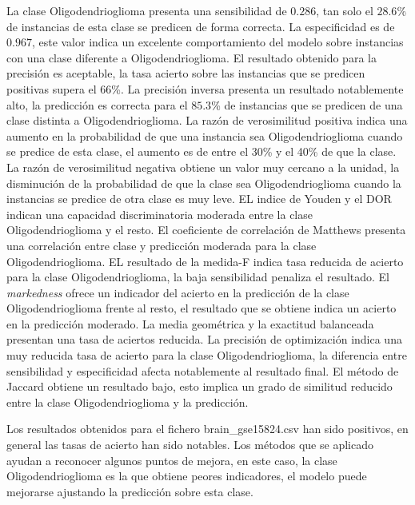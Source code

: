 La clase Oligodendrioglioma presenta una sensibilidad de $0.286$, tan solo el $28.6$\% de instancias de esta clase se predicen de forma correcta. La especificidad es de $0.967$, este valor indica un excelente comportamiento del modelo sobre instancias con una clase diferente a Oligodendrioglioma. El resultado obtenido para la precisión es aceptable, la tasa acierto sobre las instancias que se predicen positivas supera el $66$\%. La precisión inversa presenta un resultado notablemente alto, la predicción es correcta para el $85.3$\% de instancias que se predicen de una clase distinta a Oligodendrioglioma. La razón de verosimilitud positiva indica una aumento en la probabilidad de que una instancia sea Oligodendrioglioma cuando se predice de esta clase, el aumento es de entre el 30\% y el 40\% de que la clase. La razón de verosimilitud negativa obtiene un valor muy cercano a la unidad, la disminución de la probabilidad de que la clase sea Oligodendrioglioma cuando la instancias se predice de otra clase es muy leve. EL indice de Youden y el DOR indican una capacidad discriminatoria moderada entre la clase Oligodendrioglioma y el resto. El coeficiente de correlación de Matthews presenta una correlación entre clase y predicción moderada para la clase Oligodendrioglioma. EL resultado de la medida-F indica tasa reducida de acierto para la clase Oligodendrioglioma, la baja sensibilidad penaliza el resultado. El \textit{markedness} ofrece un indicador del acierto en la predicción de la clase Oligodendrioglioma frente al resto, el resultado que se obtiene indica un acierto en la predicción moderado. La media geométrica y la exactitud balanceada presentan una tasa de aciertos reducida. La precisión de optimización indica una muy reducida tasa de acierto para la clase Oligodendrioglioma, la diferencia entre sensibilidad y especificidad afecta notablemente al resultado final. El método de Jaccard obtiene un resultado bajo, esto implica un grado de similitud reducido entre la clase Oligodendrioglioma y la predicción.



\bigbreak

Los resultados obtenidos para el fichero brain\_gse15824.csv han sido positivos, en general las tasas de acierto han sido notables. Los métodos que se aplicado ayudan a reconocer algunos puntos de mejora, en este caso, la clase Oligodendrioglioma es la que obtiene peores indicadores, el modelo puede mejorarse ajustando la predicción sobre esta clase.

